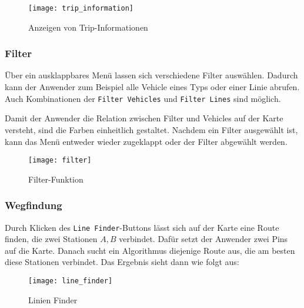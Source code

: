     \begin{figure}[htbp]
      \begin{center}
        \texttt{[image: trip\_information]}
        \caption{Anzeigen von Trip-Informationen}
        \label{fig:trip_information}
      \end{center}
    \end{figure}
    

  \subsubsection*{Filter}
  \label{ssub:filter}
    Über ein ausklappbares Menü lassen sich verschiedene Filter auswählen. Dadurch kann der Anwender zum Beispiel alle Vehicle eines Typs oder einer Linie abrufen. Auch Kombinationen der \texttt{Filter Vehicles} und \texttt{Filter Lines} sind möglich.

    Damit der Anwender die Relation zwischen Filter und Vehicles auf der Karte versteht, sind die Farben einheitlich gestaltet. Nachdem ein Filter ausgewählt ist, kann das Menü entweder wieder zugeklappt oder der Filter abgewählt werden.

    \begin{figure}[htbp]
      \begin{center}
        \texttt{[image: filter]}
        \caption{Filter-Funktion}
        \label{fig:filter}
      \end{center}
    \end{figure}
    

  \subsubsection*{Wegfindung}
  \label{ssub:wegfindung}
    Durch Klicken des \texttt{Line Finder}-Buttons {\Large {}} lässt sich auf der Karte eine Route finden, die zwei Stationen $A, B$ verbindet. Dafür setzt der Anwender zwei Pins auf die Karte. Danach sucht ein Algorithmus diejenige Route aus, die am besten diese Stationen verbindet. Das Ergebnis sieht dann wie folgt aus:

    \begin{figure}[htbp]
      \begin{center}
        \texttt{[image: line\_finder]}
        \caption{Linien Finder}
        \label{fig:line_finder}
      \end{center}
    \end{figure}


